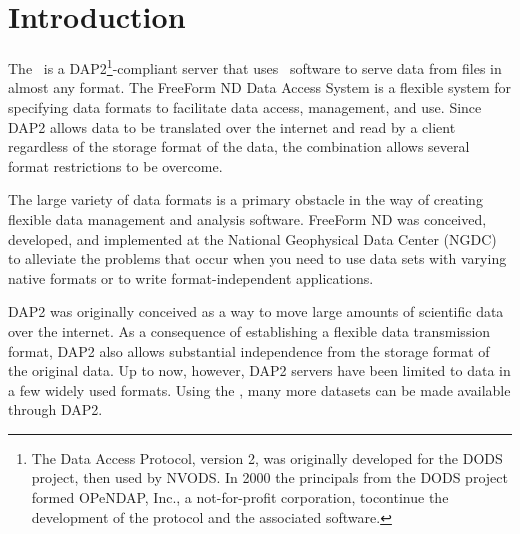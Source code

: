 %
%


\chapter{Introduction}
\label{ff,dintro}

The \ffs\ is a DAP2\footnote{The Data Access Protocol, version 2, was
  originally developed for the DODS project, then used by NVODS. In
  2000 the principals from the DODS project formed OPeNDAP, Inc., a
  not-for-profit corporation, tocontinue the development of the
  protocol and the associated software.}-compliant server that uses
\ffnd\ software to serve data from files in almost any format. The
FreeForm ND Data Access System is a flexible system for specifying
data formats to facilitate data access, management, and use. Since
DAP2 allows data to be translated over the internet and read by a
client regardless of the storage format of the data, the combination
allows several format restrictions to be overcome.

The large variety of data formats is a primary obstacle in the way of
creating flexible data management and analysis software. FreeForm ND
was conceived, developed, and implemented at the National Geophysical
Data Center (NGDC) to alleviate the problems that occur when you need
to use data sets with varying native formats or to write
format-independent applications.

DAP2 was originally conceived as a way to move large amounts of
scientific data over the internet.  As a consequence of establishing a
flexible data transmission format, DAP2 also allows substantial
independence from the storage format of the original data.  Up to now,
however, DAP2 servers have been limited to data in a few widely used
formats.  Using the \ffs , many more datasets can be made available
through DAP2.




